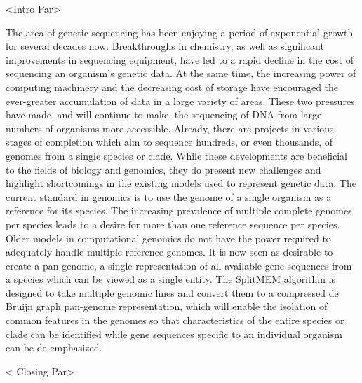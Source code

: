 \documentclass{paper}
\begin{document}
<Intro Par>
\newline\newline

The area of genetic sequencing has been enjoying a period of exponential growth for several decades now. Breakthroughs in chemistry, as well as significant improvements in sequencing equipment, have led to a rapid decline in the cost of sequencing an organism's genetic data. At the same time, the increasing power of computing machinery and the decreasing cost of storage have encouraged the ever-greater accumulation of data in a large variety of areas. These two pressures have made, and will continue to make, the sequencing of DNA from large numbers of organisms more accessible. Already, there are projects in various stages of completion which aim to sequence hundreds, or even thousands, of genomes from a single species or clade. While these developments are beneficial to the fields of biology and genomics, they do present new challenges and highlight shortcomings in the existing models used to represent genetic data. The current standard in genomics is to use the genome of a single organism as a reference for its species. The increasing prevalence of multiple complete genomes per species leads to a desire for more than one reference sequence per species. Older models in computational genomics do not have the power required to adequately handle multiple reference genomes. It is now seen as desirable to create a pan-genome, a single representation of all available gene sequences from a species which can be viewed as a single entity. The SplitMEM algorithm is designed to take multiple genomic lines and convert them to a compressed de Bruijn graph pan-genome representation, which will enable the isolation of common features in the genomes so that characteristics of the entire species or clade can be identified while gene sequences specific to an individual organism can be de-emphasized.
\newline\newline

< Closing Par>
\end{document}
